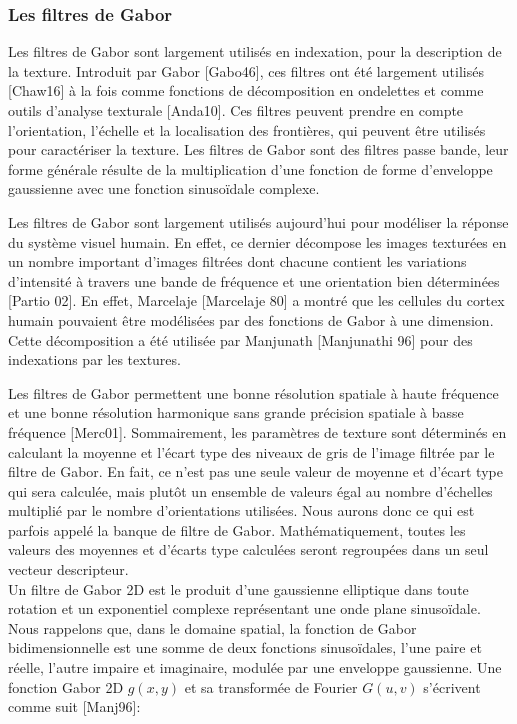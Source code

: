 \subsubsection{Les filtres de Gabor}

Les filtres de Gabor sont largement utilisés en indexation, pour la description de la texture.
Introduit par Gabor [Gabo46], ces filtres ont été largement utilisés [Chaw16] à la fois comme fonctions de décomposition en ondelettes et comme outils d'analyse texturale [Anda10]. Ces filtres peuvent prendre en compte l'orientation, l'échelle et la localisation des frontières, qui peuvent être utilisés pour caractériser la texture. Les filtres de Gabor sont des filtres passe bande, leur forme générale résulte de la multiplication d’une fonction de forme d'enveloppe gaussienne avec une fonction sinusoïdale complexe.

Les filtres de Gabor sont largement utilisés aujourd’hui pour modéliser la réponse du système visuel humain. En effet, ce dernier décompose les images texturées en un nombre important d'images filtrées dont chacune contient les variations d'intensité à travers une bande de fréquence et une orientation bien déterminées [Partio 02]. En effet, Marcelaje [Marcelaje 80] a montré que les cellules du cortex humain pouvaient être modélisées par des fonctions de Gabor à une dimension. Cette décomposition a été utilisée par Manjunath [Manjunathi 96] pour des indexations par les textures.

Les filtres de Gabor permettent une bonne résolution spatiale à haute fréquence et une bonne résolution harmonique sans grande précision spatiale à basse fréquence [Merc01]. Sommairement, les paramètres de texture sont déterminés en calculant la moyenne et l’écart type des niveaux de gris de l’image filtrée par le filtre de Gabor. En fait, ce n’est pas une seule valeur de moyenne et d’écart type qui sera calculée, mais plutôt un ensemble de valeurs égal au nombre d’échelles multiplié par le nombre d’orientations utilisées. Nous aurons donc ce qui est parfois appelé la banque de filtre de Gabor. Mathématiquement, toutes les valeurs des moyennes et d’écarts type calculées seront regroupées dans un seul vecteur descripteur. \\

Un filtre de Gabor 2D est le produit d'une gaussienne elliptique dans toute rotation et un exponentiel complexe représentant une onde plane sinusoïdale. Nous rappelons que, dans le domaine spatial, la fonction de Gabor bidimensionnelle est une somme de deux fonctions sinusoïdales, l'une paire et réelle, l'autre impaire et imaginaire, modulée par une enveloppe gaussienne. Une fonction Gabor 2D $g(x, y)$ et sa transformée de Fourier $G(u, v)$ s'écrivent comme suit [Manj96]:



